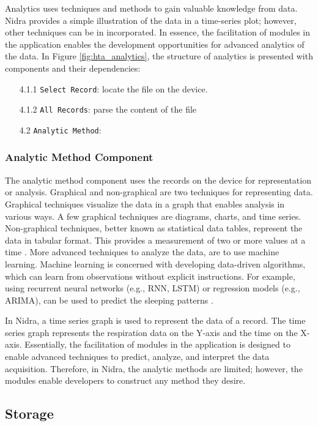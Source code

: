 Analytics uses techniques and methods to gain valuable knowledge from data. Nidra provides a simple illustration of the data in a time-series plot; however, other techniques can be in incorporated. In essence, the facilitation of modules in the application enables the development opportunities for advanced analytics of the data. In Figure \ref{fig:hta_analytics}, the structure of analytics is presented with components and their dependencies: 

\begin{itemize}
    \item[4.1.1] \verb|Select Record|: locate the file on the device.
    \item[4.1.2] \verb|All Records|: parse the content of the file 
    \item[4.2] \verb|Analytic Method|: 
\end{itemize}

\subsubsection{Analytic Method Component}
The analytic method component uses the records on the device for representation or analysis. Graphical and non-graphical are two techniques for representing data. Graphical techniques visualize the data in a graph that enables analysis in various ways. A few graphical techniques are diagrams, charts, and time series. Non-graphical techniques, better known as statistical data tables, represent the data in tabular format. This provides a measurement of two or more values at a time \cite{datarepresentation}. More advanced techniques to analyze the data, are to use machine learning. Machine learning is concerned with developing data-driven algorithms, which can learn from observations without explicit instructions. For example, using recurrent neural networks (e.g., RNN, LSTM) or regression models (e.g., ARIMA), can be used to predict the sleeping patterns \cite{machinelearning}.

In Nidra, a time series graph is used to represent the data of a record. The time series graph represents the respiration data on the Y-axis and the time on the X-axis. Essentially, the facilitation of modules in the application is designed to enable advanced techniques to predict, analyze, and interpret the data acquisition. Therefore, in Nidra, the analytic methods are limited; however, the modules enable developers to construct any method they desire. 

\subsection{Storage}\label{soc:storage}

